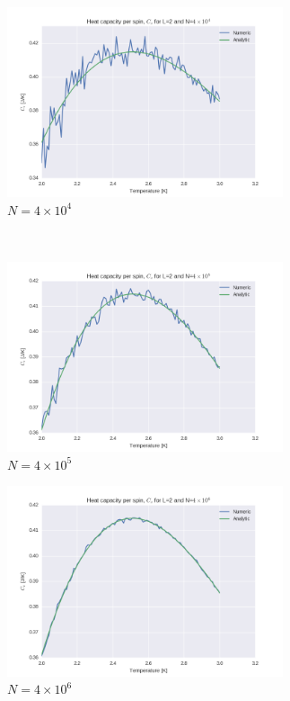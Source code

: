 \documentclass[a4paper, 10pt]{article}
\begin{document}
\begin{figure}[!ht]
    \centering
    \begin{subfigure}[H!]{0.5\textwidth}
        \centering
        \includegraphics[height=2.2in]{L2Cv4e4.png}
        \caption{$N=4\times 10^4$}
    \end{subfigure}%
    ~ 
    \begin{subfigure}[H!]{0.5\textwidth}
        \centering
        \includegraphics[height=2.2in]{L2Cv4e5.png}
        \caption{$N=4\times 10^5$}
    \end{subfigure}
    \begin{subfigure}[H!]{0.5\textwidth}
        \centering
        \includegraphics[height=2.2in]{L2Cv4e6.png}
        \caption{$N=4\times 10^6$}
    \end{subfigure}%
    ~ 
    \begin{subfigure}[H!]{0.5\textwidth}
        \centering

\end{subfigure}
\end{figure}
\end{document}
